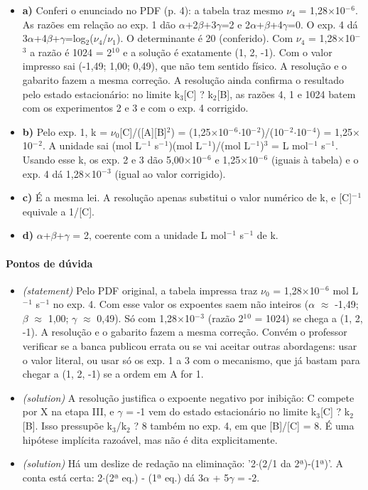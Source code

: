 \documentclass{article}%
\begin{document}
\begin{itemize}%
\item%
\textbf{a)} Conferi o enunciado no PDF (p. 4): a tabela traz mesmo $\nu$$_{4}$ = 1,28$\times$10$^{-}$$^{6}$. As razões em relação ao exp. 1 dão $\alpha$+2$\beta$+3$\gamma$=2 e 2$\alpha$+$\beta$+4$\gamma$=0. O exp. 4 dá 3$\alpha$+4$\beta$+$\gamma$=log$_{2}$($\nu$$_{4}$/$\nu$$_{1}$). O determinante é 20 (conferido). Com $\nu$$_{4}$ = 1,28$\times$10$^{-}$$^3$ a razão é 1024 = 2$^{1}$$^{0}$ e a solução é exatamente (1, 2, -1). Com o valor impresso sai (-1,49; 1,00; 0,49), que não tem sentido físico. A resolução e o gabarito fazem a mesma correção. A resolução ainda confirma o resultado pelo estado estacionário: no limite k$_{3}${[}C{]} ? k$_{2}${[}B{]}, as razões 4, 1 e 1024 batem com os experimentos 2 e 3 e com o exp. 4 corrigido.%
\item%
\textbf{b)} Pelo exp. 1, k = $\nu$$_{0}${[}C{]}/({[}A{]}{[}B{]}$^2$) = (1,25$\times$10$^{-}$$^{6}$$\cdot$10$^{-}$$^2$)/(10$^{-}$$^2$$\cdot$10$^{-}$$^{4}$) = 1,25$\times$10$^{-}$$^2$. A unidade sai (mol L$^{-}$$^{1}$ s$^{-}$$^{1}$)(mol L$^{-}$$^{1}$)/(mol L$^{-}$$^{1}$)$^3$ = L mol$^{-}$$^{1}$ s$^{-}$$^{1}$. Usando esse k, os exp. 2 e 3 dão 5,00$\times$10$^{-}$$^{6}$ e 1,25$\times$10$^{-}$$^{6}$ (iguais à tabela) e o exp. 4 dá 1,28$\times$10$^{-}$$^3$ (igual ao valor corrigido).%
\item%
\textbf{c)} É a mesma lei. A resolução apenas substitui o valor numérico de k, e {[}C{]}$^{-}$$^{1}$ equivale a 1/{[}C{]}.%
\item%
\textbf{d)} $\alpha$+$\beta$+$\gamma$ = 2, coerente com a unidade L mol$^{-}$$^{1}$ s$^{-}$$^{1}$ de k.%
\end{itemize}%
\paragraph{Pontos de dúvida}%
\begin{itemize}%
\item%
\textit{(statement)} Pelo PDF original, a tabela impressa traz $\nu$$_{0}$ = 1,28$\times$10$^{-}$$^{6}$ mol L$^{-}$$^{1}$ s$^{-}$$^{1}$ no exp. 4. Com esse valor os expoentes saem não inteiros ($\alpha$ $\approx$ -1,49; $\beta$ $\approx$ 1,00; $\gamma$ $\approx$ 0,49). Só com 1,28$\times$10$^{-}$$^3$ (razão 2$^{1}$$^{0}$ = 1024) se chega a (1, 2, -1). A resolução e o gabarito fazem a mesma correção. Convém o professor verificar se a banca publicou errata ou se vai aceitar outras abordagens: usar o valor literal, ou usar só os exp. 1 a 3 com o mecanismo, que já bastam para chegar a (1, 2, -1) se a ordem em A for 1.%
\item%
\textit{(solution)} A resolução justifica o expoente negativo por inibição: C compete por X na etapa III, e $\gamma$ = -1 vem do estado estacionário no limite k$_{3}${[}C{]} ? k$_{2}${[}B{]}. Isso pressupõe k$_{3}$/k$_{2}$ ? 8 também no exp. 4, em que {[}B{]}/{[}C{]} = 8. É uma hipótese implícita razoável, mas não é dita explicitamente.%
\item%
\textit{(solution)} Há um deslize de redação na eliminação: '2$\cdot$(2/1 da 2ª)-(1ª)'. A conta está certa: 2$\cdot$(2ª eq.) - (1ª eq.) dá 3$\alpha$ + 5$\gamma$ = -2.%
\end{itemize}%
\end{document}
